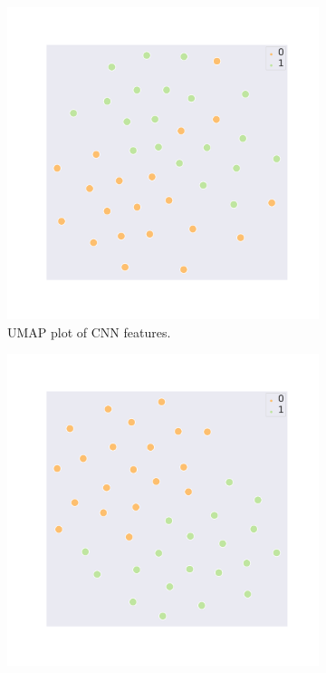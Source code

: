 \begin{figure}[t]
     \centering
     \begin{subfigure}[b]{0.4\textwidth}
         \centering
         \captionsetup{justification=centering}
         \includegraphics[width=\textwidth,trim=2.55cm 3cm 2.6cm 2.6cm, clip]{chapters/assets/samptr_extra/cnn_val_emb.pdf}
         \caption{UMAP plot of CNN features.}
     \end{subfigure}
     \hspace{1cm}
     \begin{subfigure}[b]{0.4\textwidth}
         \centering
         \captionsetup{justification=centering}
         \includegraphics[width=\textwidth, trim=2.55cm 3cm 2.6cm 2.6cm, clip]{chapters/assets/samptr_extra/gnn_val_emb.pdf}

\end{subfigure}
\end{figure}
